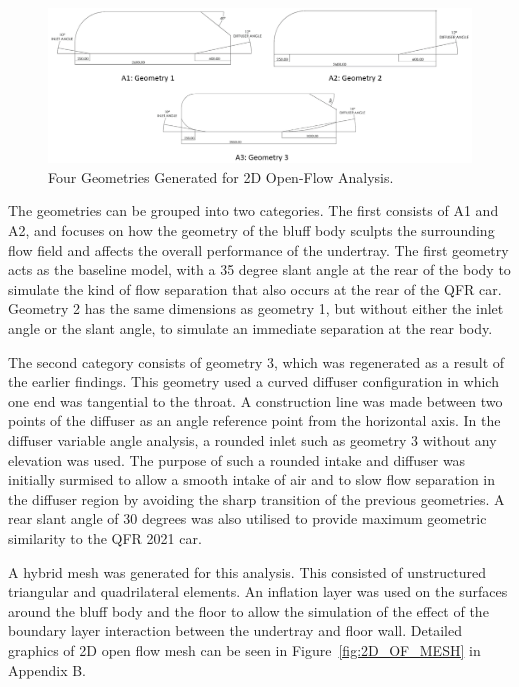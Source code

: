 \begin{figure}[!ht]
    \centering
    \includegraphics[scale = 0.5]{Figures/2D_OF/2D_OF_GEOM.png}
    \caption{Four Geometries Generated for 2D Open-Flow Analysis.}
    \label{fig:2D_OF_GEOM}
\end{figure}

\noindent The geometries can be grouped into two categories. The first consists of A1 and A2, and focuses on how the geometry of the bluff body sculpts the surrounding flow field and affects the overall performance of the undertray. The first geometry acts as the baseline model, with a 35 degree slant angle at the rear of the body to simulate the kind of flow separation that also occurs at the rear of the QFR car. Geometry 2 has the same dimensions as geometry 1, but without either the inlet angle or the slant angle, to simulate an immediate separation at the rear body.

\noindent The second category consists of geometry 3, which was regenerated as a result of the earlier findings. This geometry used a curved diffuser configuration in which one end was tangential to the throat. A construction line was made between two points of the diffuser as an angle reference point from the horizontal axis. In the diffuser variable angle analysis, a rounded inlet such as geometry 3 without any elevation was used. The purpose of such a rounded intake and diffuser was initially surmised to allow a smooth intake of air and to slow flow separation in the diffuser region by avoiding the sharp transition of the previous geometries. A rear slant angle of 30 degrees was also utilised to provide maximum geometric similarity to the QFR 2021 car.

\noindent A hybrid mesh was generated for this analysis. This consisted of unstructured triangular and quadrilateral elements. An inflation layer was used on the surfaces around the bluff body and the floor to allow the simulation of the effect of the boundary layer interaction between the undertray and floor wall. Detailed graphics of 2D open flow mesh can be seen in Figure~\ref{fig:2D_OF_MESH} in Appendix B.

